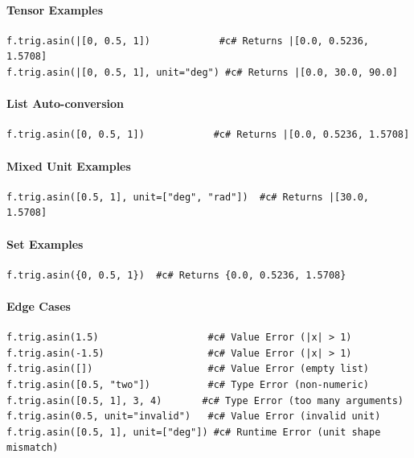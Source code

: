 \paragraph{Tensor Examples}
\begin{verbatim}
f.trig.asin(|[0, 0.5, 1])            #c# Returns |[0.0, 0.5236, 1.5708]
f.trig.asin(|[0, 0.5, 1], unit="deg") #c# Returns |[0.0, 30.0, 90.0]
\end{verbatim}

\paragraph{List Auto-conversion}
\begin{verbatim}
f.trig.asin([0, 0.5, 1])            #c# Returns |[0.0, 0.5236, 1.5708]
\end{verbatim}

\paragraph{Mixed Unit Examples}
\begin{verbatim}
f.trig.asin([0.5, 1], unit=["deg", "rad"])  #c# Returns |[30.0, 1.5708]
\end{verbatim}

\paragraph{Set Examples}
\begin{verbatim}
f.trig.asin({0, 0.5, 1})  #c# Returns {0.0, 0.5236, 1.5708}
\end{verbatim}

\paragraph{Edge Cases}
\begin{verbatim}
f.trig.asin(1.5)                   #c# Value Error (|x| > 1)
f.trig.asin(-1.5)                  #c# Value Error (|x| > 1)
f.trig.asin([])                    #c# Value Error (empty list)
f.trig.asin([0.5, "two"])          #c# Type Error (non-numeric)
f.trig.asin([0.5, 1], 3, 4)       #c# Type Error (too many arguments)
f.trig.asin(0.5, unit="invalid")   #c# Value Error (invalid unit)
f.trig.asin([0.5, 1], unit=["deg"]) #c# Runtime Error (unit shape mismatch)
\end{verbatim}

